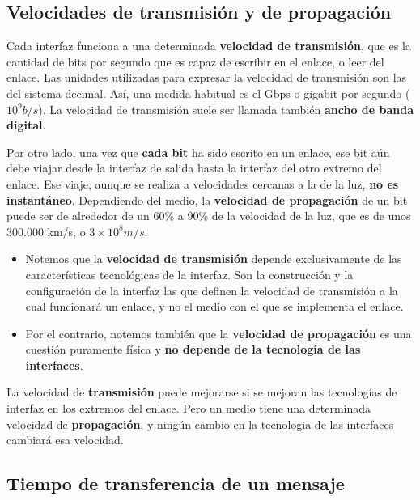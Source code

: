 \documentclass[spanish,a4paper,]{article}
\providecommand{\tightlist}{%
  \setlength{\itemsep}{0pt}\setlength{\parskip}{0pt}}
\begin{document}
\hypertarget{velocidades-de-transmisiuxf3n-y-de-propagaciuxf3n}{%
\subsection{Velocidades de transmisión y de
propagación}\label{velocidades-de-transmisiuxf3n-y-de-propagaciuxf3n}}

Cada interfaz funciona a una determinada \textbf{velocidad de
transmisión}, que es la cantidad de bits por segundo que es capaz de
escribir en el enlace, o leer del enlace. Las unidades utilizadas para
expresar la velocidad de transmisión son las del sistema decimal. Así,
una medida habitual es el Gbps o gigabit por segundo (\(10^9 b/s\)). La
velocidad de transmisión suele ser llamada también \textbf{ancho de
banda digital}.

Por otro lado, una vez que \textbf{cada bit} ha sido escrito en un
enlace, ese bit aún debe viajar desde la interfaz de salida hasta la
interfaz del otro extremo del enlace. Ese viaje, aunque se realiza a
velocidades cercanas a la de la luz, \textbf{no es instantáneo}.
Dependiendo del medio, la \textbf{velocidad de propagación} de un bit
puede ser de alrededor de un 60\% a 90\% de la velocidad de la luz, que
es de unos 300.000 km/s, o \(3\times 10^8 m/s\).

\begin{itemize}
\tightlist
\item
  Notemos que la \textbf{velocidad de transmisión} depende
  exclusivamente de las características tecnológicas de la interfaz. Son
  la construcción y la configuración de la interfaz las que definen la
  velocidad de transmisión a la cual funcionará un enlace, y no el medio
  con el que se implementa el enlace.
\item
  Por el contrario, notemos también que la \textbf{velocidad de
  propagación} es una cuestión puramente física y \textbf{no depende de
  la tecnología de las interfaces}.
\end{itemize}

La velocidad de \textbf{transmisión} puede mejorarse si se mejoran las
tecnologías de interfaz en los extremos del enlace. Pero un medio tiene
una determinada velocidad de \textbf{propagación}, y ningún cambio en la
tecnologia de las interfaces cambiará esa velocidad.

\hypertarget{tiempo-de-transferencia-de-un-mensaje}{%
\subsection{Tiempo de transferencia de un
mensaje}\label{tiempo-de-transferencia-de-un-mensaje}}
\end{document}
